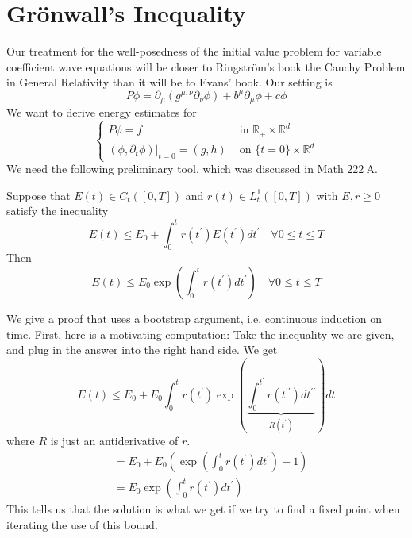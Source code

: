 \newpage 
\section{Gr\"onwall's Inequality}
Our treatment for the well-posedness of the initial value problem for variable coefficient wave equations will be closer to Ringström's book the Cauchy Problem in General Relativity than it will be to Evans' book.
Our setting is
$$
P \phi=\partial_{\mu}\left(g^{\mu, \nu} \partial_{\nu} \phi\right)+b^{\mu} \partial_{\mu} \phi+c \phi
$$
We want to derive energy estimates for
$$
\begin{cases}P \phi=f & \text { in } \mathbb{R}_{+} \times \mathbb{R}^{d} \\ \left.\left(\phi, \partial_{t} \phi\right)\right|_{t=0}=(g, h) & \text { on }\{t=0\} \times \mathbb{R}^{d}\end{cases}
$$
We need the following preliminary tool, which was discussed in Math $222 \mathrm{~A}$.

\begin{lemma}
Suppose that $E(t) \in C_{t}([0, T])$ and $r(t) \in L_{t}^{1}([0, T])$ with $E, r \geq 0$ satisfy the inequality
$$
E(t) \leq E_{0}+\int_{0}^{t} r\left(t^{\prime}\right) E\left(t^{\prime}\right) d t^{\prime} \quad \forall 0 \leq t \leq T
$$
Then
$$
E(t) \leq E_{0} \exp \left(\int_{0}^{t} r\left(t^{\prime}\right) d t^{\prime}\right) \quad \forall 0 \leq t \leq T
$$
\end{lemma}

We give a proof that uses a bootstrap argument, i.e. continuous induction on time. First, here is a motivating computation: Take the inequality we are given, and plug in the answer into the right hand side. We get
$$
E(t) \leq E_{0}+E_{0} \int_{0}^{t} r\left(t^{\prime}\right) \exp (\underbrace{\int_{0}^{t^{\prime}} r\left(t^{\prime \prime}\right) d t^{\prime \prime}}_{R\left(t^{\prime}\right)}) d t
$$
where $R$ is just an antiderivative of $r$.
$$
\begin{aligned}
&=E_{0}+E_{0}\left(\exp \left(\int_{0}^{t} r\left(t^{\prime}\right) d t^{\prime}\right)-1\right) \\
&=E_{0} \exp \left(\int_{0}^{t} r\left(t^{\prime}\right) d t^{\prime}\right)
\end{aligned}
$$
This tells us that the solution is what we get if we try to find a fixed point when iterating the use of this bound.

